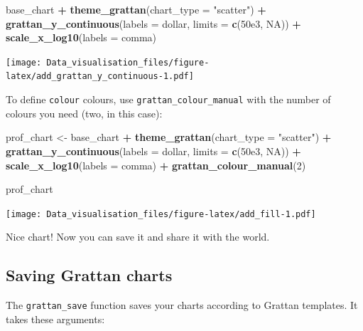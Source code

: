 \documentclass[]{book}
\newenvironment{Shaded}{\begin{snugshade}}{\end{snugshade}}
\newcommand{\DataTypeTok}[1]{\textcolor[rgb]{0.13,0.29,0.53}{#1}}
\newcommand{\DecValTok}[1]{\textcolor[rgb]{0.00,0.00,0.81}{#1}}
\newcommand{\FloatTok}[1]{\textcolor[rgb]{0.00,0.00,0.81}{#1}}
\newcommand{\KeywordTok}[1]{\textcolor[rgb]{0.13,0.29,0.53}{\textbf{#1}}}
\newcommand{\NormalTok}[1]{#1}
\newcommand{\OperatorTok}[1]{\textcolor[rgb]{0.81,0.36,0.00}{\textbf{#1}}}
\newcommand{\OtherTok}[1]{\textcolor[rgb]{0.56,0.35,0.01}{#1}}
\newcommand{\StringTok}[1]{\textcolor[rgb]{0.31,0.60,0.02}{#1}}
\begin{document}
\begin{Shaded}
\begin{Highlighting}[]
\NormalTok{base_chart }\OperatorTok{+}
\StringTok{        }\KeywordTok{theme_grattan}\NormalTok{(}\DataTypeTok{chart_type =} \StringTok{"scatter"}\NormalTok{) }\OperatorTok{+}
\StringTok{        }\KeywordTok{grattan_y_continuous}\NormalTok{(}\DataTypeTok{labels =}\NormalTok{ dollar, }\DataTypeTok{limits =} \KeywordTok{c}\NormalTok{(}\FloatTok{50e3}\NormalTok{, }\OtherTok{NA}\NormalTok{)) }\OperatorTok{+}
\StringTok{        }\KeywordTok{scale_x_log10}\NormalTok{(}\DataTypeTok{labels =}\NormalTok{ comma) }
\end{Highlighting}
\end{Shaded}

\texttt{[image: Data\_visualisation\_files/figure-latex/add\_grattan\_y\_continuous-1.pdf]}

To define \texttt{colour} colours, use \texttt{grattan\_colour\_manual} with the number of colours you need (two, in this case):

\begin{Shaded}
\begin{Highlighting}[]
\NormalTok{prof_chart <-}\StringTok{ }\NormalTok{base_chart }\OperatorTok{+}
\StringTok{        }\KeywordTok{theme_grattan}\NormalTok{(}\DataTypeTok{chart_type =} \StringTok{"scatter"}\NormalTok{) }\OperatorTok{+}
\StringTok{        }\KeywordTok{grattan_y_continuous}\NormalTok{(}\DataTypeTok{labels =}\NormalTok{ dollar, }\DataTypeTok{limits =} \KeywordTok{c}\NormalTok{(}\FloatTok{50e3}\NormalTok{, }\OtherTok{NA}\NormalTok{)) }\OperatorTok{+}
\StringTok{        }\KeywordTok{scale_x_log10}\NormalTok{(}\DataTypeTok{labels =}\NormalTok{ comma) }\OperatorTok{+}
\StringTok{        }\KeywordTok{grattan_colour_manual}\NormalTok{(}\DecValTok{2}\NormalTok{) }

\NormalTok{prof_chart}
\end{Highlighting}
\end{Shaded}

\texttt{[image: Data\_visualisation\_files/figure-latex/add\_fill-1.pdf]}

Nice chart! Now you can save it and share it with the world.

\hypertarget{saving-grattan-charts}{%
\subsection{Saving Grattan charts}\label{saving-grattan-charts}}

The \texttt{grattan\_save} function saves your charts according to Grattan templates. It takes these arguments:
\end{document}
